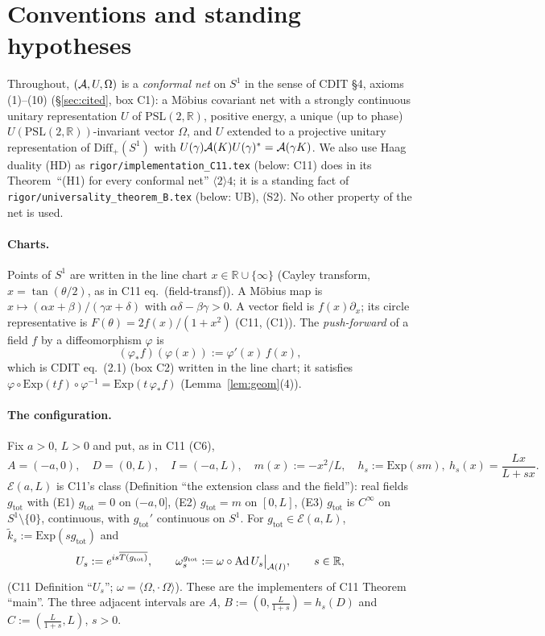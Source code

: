 \documentclass[11pt]{article}
\newcommand{\Om}{\Omega}
\newcommand{\ip}[2]{\langle#1,#2\rangle}
\newcommand{\Ad}{\operatorname{Ad}}
\newcommand{\gtot}{g_{\mathrm{tot}}}
\newcommand{\kt}{\widetilde k}
\newcommand{\Diff}{\mathrm{Diff}_+}
\newcommand{\PSL}{\mathrm{PSL}(2,\mathbb R)}
\begin{document}
\section{Conventions and standing hypotheses}\label{sec:conv}
Throughout, $(\cA,U,\Om)$ is a \emph{conformal net} on $S^1$ in the sense of CDIT \S4, axioms (1)--(10)
(\S\ref{sec:cited}, box C1): a Möbius covariant net with a strongly continuous unitary representation $U$ of $\PSL$,
positive energy, a unique (up to phase) $U(\PSL)$-invariant vector $\Om$, and $U$ extended to a projective unitary
representation of $\Diff(S^1)$ with $U(\gamma)\mathcal A(K)U(\gamma)^*=\mathcal A(\gamma K)$.  We also use Haag duality (HD) as
\texttt{rigor/implementation\_C11.tex} (below: C11) does in its Theorem~``(H1) for every conformal net''
$\langle2\rangle4$; it is a standing fact of \texttt{rigor/universality\_theorem\_B.tex} (below: UB), (S2).
No other property of the net is used.

\paragraph{Charts.}  Points of $S^1$ are written in the line chart $x\in\mathbb R\cup\{\infty\}$ (Cayley transform,
$x=\tan(\theta/2)$, as in C11 eq.~(field-transf)).  A Möbius map is $x\mapsto(\alpha x+\beta)/(\gamma x+\delta)$
with $\alpha\delta-\beta\gamma>0$.  A vector field is $f(x)\partial_x$; its circle representative is
$F(\theta)=2f(x)/(1+x^2)$ (C11, (C1)).  The \emph{push-forward} of a field $f$ by a diffeomorphism $\varphi$ is
\begin{equation}\label{eq:push}
 (\varphi_*f)(\varphi(x)):=\varphi'(x)\,f(x),
\end{equation}
which is CDIT eq.~(2.1) (box C2) written in the line chart; it satisfies
$\varphi\circ\mathrm{Exp}(tf)\circ\varphi^{-1}=\mathrm{Exp}(t\,\varphi_*f)$ (Lemma~\ref{lem:geom}(4)).

\paragraph{The configuration.}  Fix $a>0$, $L>0$ and put, as in C11 (C6),
\begin{equation}\label{eq:conf}
 A=(-a,0),\quad D=(0,L),\quad I=(-a,L),\quad m(x):=-x^2/L,\quad h_s:=\mathrm{Exp}(sm),\ h_s(x)=\frac{Lx}{L+sx}.
\end{equation}
$\mathcal E(a,L)$ is C11's class (Definition ``the extension class and the field''): real fields $\gtot$ with
(E1) $\gtot=0$ on $(-a,0]$, (E2) $\gtot=m$ on $[0,L]$, (E3) $\gtot$ is $C^\infty$ on $S^1\setminus\{0\}$, continuous,
with $\gtot'$ continuous on $S^1$.  For $\gtot\in\mathcal E(a,L)$, $\kt_s:=\mathrm{Exp}(s\gtot)$ and
\begin{equation}\label{eq:Us}
 U_s:=e^{is\overline{T(\gtot)}},\qquad \omega_s^{\gtot}:=\omega\circ\Ad U_s\big|_{\cA(I)},\qquad s\in\mathbb R,
\end{equation}
(C11 Definition ``$U_s$''; $\omega=\ip\Om{\cdot\,\Om}$).  These are the implementers of C11 Theorem ``main''.
The three adjacent intervals are $A$, $B:=(0,\frac L{1+s})=h_s(D)$ and $C:=(\frac L{1+s},L)$, $s>0$.
\end{document}
